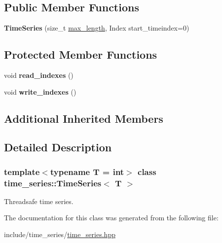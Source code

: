 \subsection*{Public Member Functions}
\begin{DoxyCompactItemize}
\item 
\mbox{\label{classtime__series_1_1TimeSeries_abd15b59569dc3dca7d1b848a0867a117}} 
{\bfseries Time\+Series} (size\+\_\+t \hyperlink{classtime__series_1_1internal_1_1TimeSeriesBase_aee1bf636a094a3068f9de731688c3972}{max\+\_\+length}, Index start\+\_\+timeindex=0)
\end{DoxyCompactItemize}
\subsection*{Protected Member Functions}
\begin{DoxyCompactItemize}
\item 
\mbox{\label{classtime__series_1_1TimeSeries_acbd2aa3299e5c62811df429896791767}} 
void {\bfseries read\+\_\+indexes} ()
\item 
\mbox{\label{classtime__series_1_1TimeSeries_a0fdedf27b55bbf78eed4d35f82cf3ace}} 
void {\bfseries write\+\_\+indexes} ()
\end{DoxyCompactItemize}
\subsection*{Additional Inherited Members}


\subsection{Detailed Description}
\subsubsection*{template$<$typename T = int$>$\newline
class time\+\_\+series\+::\+Time\+Series$<$ T $>$}

Threadsafe time series. 

The documentation for this class was generated from the following file\+:\begin{DoxyCompactItemize}
\item 
include/time\+\_\+series/\hyperlink{time__series_8hpp}{time\+\_\+series.\+hpp}\end{DoxyCompactItemize}

